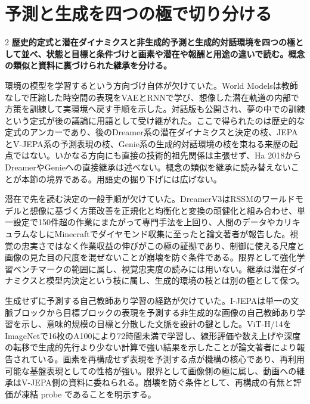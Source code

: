 \documentclass[lualatex,a4paper,10pt]{jlreq}
\begin{document}
\section{予測と生成を四つの極で切り分ける}
\label{sec:p14}
\begin{multicols}{2}
\raggedcolumns
\noindent\textbf{歴史的定式と潜在ダイナミクスと非生成的予測と生成的対話環境を四つの極として並べ、状態と目標と条件づけと画素や潜在や報酬と用途の違いで読む。概念の類似と資料に裏づけられた継承を分ける。}\autocite{vmd103,vmd105}\par\medskip
\noindent 環境の模型を学習するという方向づけ自体が欠けていた。World Modelsは教師なしで圧縮した時空間の表現をVAEとRNNで学び、想像した潜在軌道の内部で方策を訓練して実環境へ戻す手順を示した。対話版も公開され、夢の中での訓練という定式が後の議論に用語として受け継がれた。ここで得られたのは歴史的な定式のアンカーであり、後のDreamer系の潜在ダイナミクスと決定の枝、JEPAとV-JEPA系の予測表現の枝、Genie系の生成的対話環境の枝を束ねる来歴の起点ではない。いかなる方向にも直接の技術的祖先関係は主張せず、Ha 2018からDreamerやGenieへの直接継承は述べない。概念の類似を継承に読み替えないことが本節の境界である。用語史の掘り下げには広げない。\autocite{vmd101}\par\medskip
\noindent 潜在で先を読む決定の一般手順が欠けていた。DreamerV3はRSSMのワールドモデルと想像に基づく方策改善を正規化と均衡化と変換の頑健化と組み合わせ、単一設定で150件超の作業にまたがって専門手法を上回り、人間のデータやカリキュラムなしにMinecraftでダイヤモンド収集に至ったと論文著者が報告した。視覚の忠実さではなく作業収益の伸びがこの極の証拠であり、制御に使える尺度と画像の見た目の尺度を混ぜないことが崩壊を防ぐ条件である。限界として強化学習ベンチマークの範囲に属し、視覚忠実度の読みには用いない。継承は潜在ダイナミクスと模型内決定という枝に属し、生成的環境の枝とは別の極として保つ。\autocite{vmd102}\par\medskip
\noindent 生成せずに予測する自己教師あり学習の経路が欠けていた。I-JEPAは単一の文脈ブロックから目標ブロックの表現を予測する非生成的な画像の自己教師あり学習を示し、意味的規模の目標と分散した文脈を設計の鍵とした。ViT-H/14をImageNetで16枚のA100により72時間未満で学習し、線形評価や数え上げや深度の転移で生成的先行より少ない計算で強い結果を示したことが論文著者により報告されている。画素を再構成せず表現を予測する点が機構の核心であり、再利用可能な基盤表現としての性格が強い。限界として画像側の極に属し、動画への継承はV-JEPA側の資料に委ねられる。崩壊を防ぐ条件として、再構成の有無と評価が凍結 probe であることを明示する。\autocite{vmd103}\par\medskip

\end{multicols}
\end{document}
